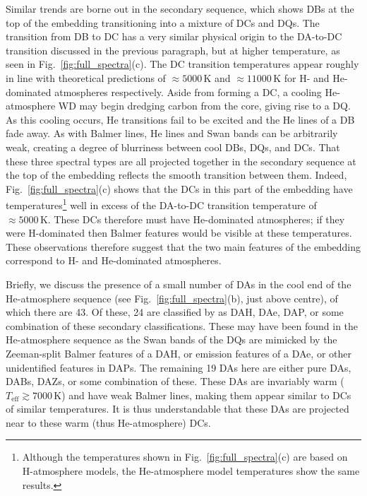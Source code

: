 \documentclass[fleqn,usenatbib]{mnras}
\def\Teff{T_\mathrm{eff}}
\begin{document}
Similar trends are borne out in the secondary sequence, which shows DBs at the top of the embedding transitioning into a mixture of DCs and DQs.
The transition from DB to DC has a very similar physical origin to the DA-to-DC transition discussed in the previous paragraph, but at higher temperature, as seen in Fig.~\ref{fig:full_spectra}(c).
The DC transition temperatures appear roughly in line with theoretical predictions of $\approx 5000\,\text{K}$ and $\approx 11000\,\text{K}$ for H- and He-dominated atmospheres respectively.
Aside from forming a DC, a cooling He-atmosphere WD may begin dredging carbon from the core, giving rise to a DQ.
As this cooling occurs, He transitions fail to be excited and the He lines of a DB fade away.
As with Balmer lines, He lines and Swan bands can be arbitrarily weak, creating a degree of blurriness between cool DBs, DQs, and DCs.
That these three spectral types are all projected together in the secondary sequence at the top of the embedding reflects the smooth transition between them.
Indeed, Fig.~\ref{fig:full_spectra}(c) shows that the DCs in this part of the embedding have temperatures\footnote{
    Although the temperatures shown in Fig.~\ref{fig:full_spectra}(c) are based on H-atmosphere models, the He-atmosphere model temperatures show the same results.
} well in excess of the DA-to-DC transition temperature of $\approx 5000\,\text{K}$.
These DCs therefore must have He-dominated atmospheres; if they were H-dominated then Balmer features would be visible at these temperatures.
These observations therefore suggest that the two main features of the embedding correspond to H- and He-dominated atmospheres.

Briefly, we discuss the presence of a small number of DAs in the cool end of the He-atmosphere sequence (see Fig.~\ref{fig:full_spectra}(b), just above centre), of which there are 43.
Of these, 24 are classified by \citet{manser24} as DAH, DAe, DAP, or some combination of these secondary classifications.
These may have been found in the He-atmosphere sequence as the Swan bands of the DQs are mimicked by the Zeeman-split Balmer features of a DAH, or emission features of a DAe, or other unidentified features in DAPs.
The remaining 19 DAs here are either pure DAs, DABs, DAZs, or some combination of these.
These DAs are invariably warm ($\Teff \gtrsim 7000\,\text{K}$) and have weak Balmer lines, making them appear similar to DCs of similar temperatures.
It is thus understandable that these DAs are projected near to these warm (thus He-atmosphere) DCs.
\end{document}
